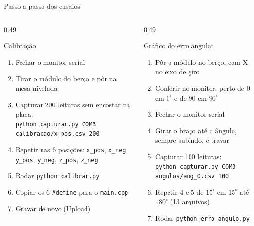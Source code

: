 \documentclass[aspectratio=169]{beamer}
\begin{document}
\begin{frame}{Passo a passo dos ensaios}
\begin{columns}[T]
\begin{column}{0.49\textwidth}
\begin{block}{Calibração}
\footnotesize
\begin{enumerate}
\item Fechar o monitor serial
\item Tirar o módulo do berço e pôr na mesa nivelada
\item Capturar 200 leituras sem encostar na placa:\\
{\tiny\texttt{python capturar.py COM3 calibracao/x\_pos.csv 200}}
\item Repetir nas 6 posições: \texttt{x\_pos}, \texttt{x\_neg}, \texttt{y\_pos}, \texttt{y\_neg}, \texttt{z\_pos}, \texttt{z\_neg}
\item Rodar \texttt{python calibrar.py}
\item Copiar os 6 \texttt{\#define} para o \texttt{main.cpp}
\item Gravar de novo (Upload)
\end{enumerate}
\end{block}
\end{column}
\begin{column}{0.49\textwidth}
\begin{block}{Gráfico do erro angular}
\footnotesize
\begin{enumerate}
\item Pôr o módulo no berço, com X no eixo de giro
\item Conferir no monitor: perto de 0 em $0^\circ$ e de 90 em $90^\circ$
\item Fechar o monitor serial
\item Girar o braço até o ângulo, sempre subindo, e travar
\item Capturar 100 leituras:\\
{\tiny\texttt{python capturar.py COM3 angulos/ang\_0.csv 100}}
\item Repetir 4 e 5 de $15^\circ$ em $15^\circ$ até $180^\circ$ (13 arquivos)
\item Rodar \texttt{python erro\_angulo.py}
\end{enumerate}
\end{block}
\end{column}
\end{columns}
\end{frame}
\end{document}
